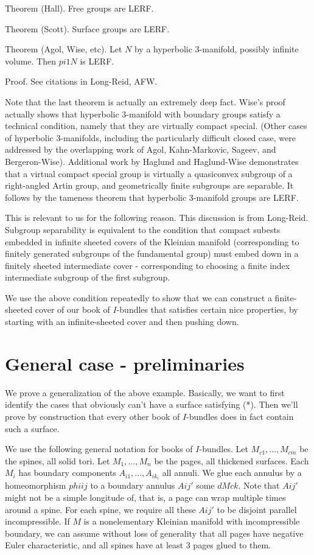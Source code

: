 \documentclass[12pt]{amsart}
\theoremstyle{definition}
\theoremstyle{remark}
\begin{document}
Theorem (Hall). Free groups are LERF.

Theorem (Scott). Surface groups are LERF.

Theorem (Agol, Wise, etc). Let $N$ by a hyperbolic 3-manifold, possibly
infinite volume. Then $pi1N$ is LERF.

Proof. See citations in Long-Reid, AFW.

Note that the last theorem is actually an extremely deep fact. Wise's proof
actually shows that hyperbolic 3-manifold with boundary groups satisfy
a technical condition, namely that they are virtually compact special. (Other
cases of hyperbolic 3-manifolds, including the particularly difficult closed
case, were addressed by the overlapping work of Agol, Kahn-Markovic, Sageev,
and Bergeron-Wise).  Additional work by Haglund and Haglund-Wise demonstrates
that a virtual compact special group is virtually a quasiconvex subgroup of
a right-angled Artin group, and geometrically finite subgroups are separable.
It follows by the tameness theorem that hyperbolic 3-manifold groups are LERF.

This is relevant to us for the following reason. This discussion is from
Long-Reid. Subgroup separability is equivalent to the condition that compact
subests embedded in infinite sheeted covers of the Kleinian manifold
(corresponding to finitely generated subgroups of the fundamental group) must
embed down in a finitely sheeted intermediate cover - corresponding to choosing
a finite index intermediate subgroup of the first subgroup.


We use the above condition repeatedly to show that we can construct
a finite-sheeted cover of our book of $I$-bundles that satisfies certain nice
properties, by starting with an infinite-sheeted cover and then pushing down.

\section{General case - preliminaries}

We prove a generalization of the above example. Basically, we want to first
identify the cases that obviously can't have a surface satisfying (*). Then
we'll prove by construction that every other book of $I$-bundles does in fact
contain such a surface.

We use the following general notation for books of $I$-bundles. Let
$M_{c1},...,M_{cm}$ be the spines, all solid tori. Let $M_1,...,M_n$ be the
pages, all thickened surfaces. Each $M_i$ has boundary components
$A_{i1},...,A_{ik_i}$ all annuli. We glue each annulus by a homeomorphism
$phiij$ to a boundary annulus $Aij'$ some $dMck$. Note that $Aij'$ might not be
a simple longitude of, that is, a page can wrap multiple times around a spine.
For each spine, we require all these $Aij'$ to be disjoint parallel
incompressible.  If $M$ is a nonelementary Kleinian manifold with
incompressible boundary, we can assume without loss of generality that all
pages have negative Euler characteristic, and all spines have at least 3 pages
glued to them.
\end{document}
